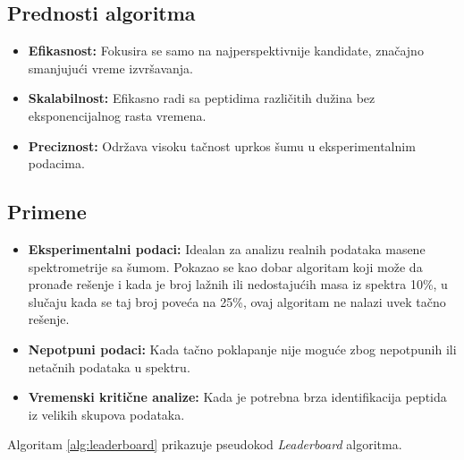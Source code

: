 \documentclass[12pt,oneside]{memoir}
\begin{document}
\subsection{Prednosti algoritma}

\begin{itemize}
    \item \textbf{Efikasnost:} Fokusira se samo na najperspektivnije kandidate, značajno smanjujući vreme izvršavanja.
    \item \textbf{Skalabilnost:} Efikasno radi sa peptidima različitih dužina bez eksponencijalnog rasta vremena.
    \item \textbf{Preciznost:} Održava visoku tačnost uprkos šumu u eksperimentalnim podacima.
\end{itemize}

\subsection{Primene}

\begin{itemize}
    \item \textbf{Eksperimentalni podaci:} Idealan za analizu realnih podataka masene spektrometrije sa šumom. Pokazao se kao dobar algoritam koji može da pronađe rešenje i kada je broj lažnih ili nedostajućih masa iz spektra 10\%, u slučaju kada se taj broj poveća na 25\%, ovaj algoritam ne nalazi uvek tačno rešenje.
    \item \textbf{Nepotpuni podaci:} Kada tačno poklapanje nije moguće zbog nepotpunih ili netačnih podataka u spektru.
    \item \textbf{Vremenski kritične analize:} Kada je potrebna brza identifikacija peptida iz velikih skupova podataka.
\end{itemize}

Algoritam \ref{alg:leaderboard} prikazuje pseudokod \emph{Leaderboard} algoritma.
\end{document}
